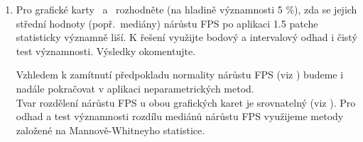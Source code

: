 \begin{enumerate}[label=\alph*)]
\begin{minipage}{0.94\textwidth}
        \label{tab:interval-estimation}
        \vspace{0.5em}
        \renewcommand{\arraystretch}{1.3}
    \end{minipage}

    \newpage
    \item Pro grafické karty \nvidiaCardTri\ a \amdCardSedm\ rozhodněte (na hladině významnosti 5 \%), zda se jejich střední hodnoty (popř.\ mediány)
    nárůstu FPS po aplikaci 1.5 patche statisticky významně liší.
    K řešení využijte bodový a intervalový odhad i čistý test významnosti.
    Výsledky okomentujte.

    \vspace{1em}
    \begin{minipage}{0.94\textwidth}
        Vzhledem k zamítnutí předpokladu normality nárůstu FPS (viz ) budeme i nadále pokračovat v aplikaci neparametrických metod. \\

        Tvar rozdělení nárůstu FPS u obou grafických karet je srovnatelný (viz ).
        Pro odhad a test významnosti rozdílu mediánů nárůstu FPS využijeme metody založené na Mannově-Whitneyho statistice.


\end{minipage}
\end{enumerate}
